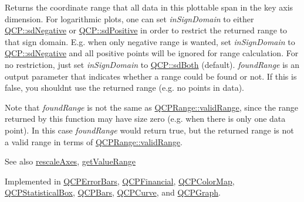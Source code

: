Returns the coordinate range that all data in this plottable span in the key axis dimension. For logarithmic plots, one can set {\itshape in\+Sign\+Domain} to either \hyperlink{namespace_q_c_p_afd50e7cf431af385614987d8553ff8a9a2d18af0bc58f6528d1e82ce699fe4829}{Q\+C\+P\+::sd\+Negative} or \hyperlink{namespace_q_c_p_afd50e7cf431af385614987d8553ff8a9a584784b75fb816abcc627cf743bb699f}{Q\+C\+P\+::sd\+Positive} in order to restrict the returned range to that sign domain. E.\+g. when only negative range is wanted, set {\itshape in\+Sign\+Domain} to \hyperlink{namespace_q_c_p_afd50e7cf431af385614987d8553ff8a9a2d18af0bc58f6528d1e82ce699fe4829}{Q\+C\+P\+::sd\+Negative} and all positive points will be ignored for range calculation. For no restriction, just set {\itshape in\+Sign\+Domain} to \hyperlink{namespace_q_c_p_afd50e7cf431af385614987d8553ff8a9aa38352ef02d51ddfa4399d9551566e24}{Q\+C\+P\+::sd\+Both} (default). {\itshape found\+Range} is an output parameter that indicates whether a range could be found or not. If this is false, you shouldn\textquotesingle{}t use the returned range (e.\+g. no points in data).

Note that {\itshape found\+Range} is not the same as \hyperlink{class_q_c_p_range_ab38bd4841c77c7bb86c9eea0f142dcc0}{Q\+C\+P\+Range\+::valid\+Range}, since the range returned by this function may have size zero (e.\+g. when there is only one data point). In this case {\itshape found\+Range} would return true, but the returned range is not a valid range in terms of \hyperlink{class_q_c_p_range_ab38bd4841c77c7bb86c9eea0f142dcc0}{Q\+C\+P\+Range\+::valid\+Range}.

\begin{DoxySeeAlso}{See also}
\hyperlink{class_q_c_p_abstract_plottable_a1491c4a606bccd2d09e65e11b79eb882}{rescale\+Axes}, \hyperlink{class_q_c_p_abstract_plottable_a4de773988b21ed090fddd27c6a3a3dcb}{get\+Value\+Range} 
\end{DoxySeeAlso}


Implemented in \hyperlink{class_q_c_p_error_bars_a6cac828a430d66ac77a167549d01d212}{Q\+C\+P\+Error\+Bars}, \hyperlink{class_q_c_p_financial_a15d68fb257113fef697356d65fa76559}{Q\+C\+P\+Financial}, \hyperlink{class_q_c_p_color_map_a985861974560f950af6cb7fae8c46267}{Q\+C\+P\+Color\+Map}, \hyperlink{class_q_c_p_statistical_box_a77d2d13301dfe60c13adfaa17fc1802f}{Q\+C\+P\+Statistical\+Box}, \hyperlink{class_q_c_p_bars_ac5a3854774d9d9cd129b1eae1426de2d}{Q\+C\+P\+Bars}, \hyperlink{class_q_c_p_curve_a22d09087f78f254731197cc0b8783299}{Q\+C\+P\+Curve}, and \hyperlink{class_q_c_p_graph_aac47c6189e3aea46ea46939e5d14796c}{Q\+C\+P\+Graph}.

